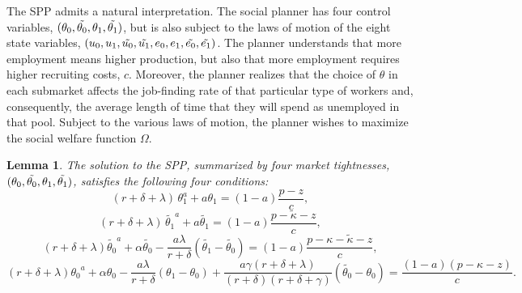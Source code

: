 \documentclass[12pt]{article} %
\newtheorem{lemma}[theorem]{Lemma}
\theoremstyle{definition}
\begin{document}
The SPP admits a natural interpretation. The social planner has four control variables, $(\theta_0, \Tilde{\theta_0}, \theta_1, \Tilde{\theta_1})$, but is also subject to the laws of motion of the eight state variables, $(u_0,  u_1, \Tilde{u_0}, \Tilde{u_1}, e_0, e_1,  \Tilde{e_0}, \Tilde{e_1})$. The planner understands that more employment means higher production, but also that more employment requires higher recruiting costs, $c$. Moreover, the planner realizes that the choice of $\theta$ in each submarket affects the job-finding rate of that particular type of workers and, consequently, the average length of time that they will spend as unemployed in that pool. Subject to the various laws of motion, the planner wishes to maximize the social welfare function $\Omega$.   
\begin{lemma}\label{lemma SPP}
The solution to the SPP, summarized by four market tightnesses, $(\theta_0, \Tilde{\theta_0}, \theta_1, \Tilde{\theta_1})$, satisfies the following four conditions: 
\begin{equation}\label{eq theta 1}
   (r+\delta +\lambda)\,\theta_1^a + a\theta_1 = (1-a) \frac{p-z}{c},    
\end{equation}
\begin{equation}\label{eq theta 1 tilde}
   (r+\delta +\lambda)\,\tilde{\theta_1}^a + a\tilde{\theta_1} = (1-a) \frac{p-\tilde{\kappa}-z}{c},
\end{equation}
\begin{equation}\label{eq theta 0 tilde}
   (r+\delta+\lambda)\tilde{\theta_0}^a +\alpha \tilde{\theta_0} - \frac{a \lambda}{r+\delta}(\tilde{\theta_1}-\tilde{\theta_0}) =(1-a)\frac{p-\kappa-\tilde{\kappa}-z}{c},  
\end{equation}
\begin{equation}\label{eq theta 0}
 (r+\delta+\lambda){\theta_0}^a +\alpha {\theta_0} -\frac{a \lambda}{r+\delta}({\theta_1}-{\theta_0})+\frac{ a\gamma(r+\delta+\lambda)}{(r+\delta)(r+\delta +\gamma)}(\tilde{\theta_0}-\theta_0) = \frac{(1-a)(p-\kappa-z)}{c}. 
\end{equation}
\end{lemma}
\end{document}
